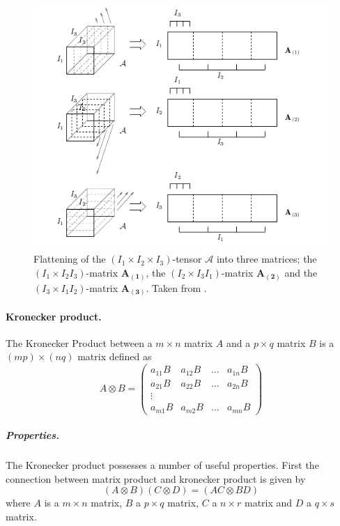 \documentclass[11pt,a4paper]{report}
\begin{document}
\begin{figure}[H]
\centering
\includegraphics[scale=0.75]{images/flattening3.png}
\caption{ Flattening of the $(I_1\times I_2 \times I_3)$-tensor $\mathcal{A}$
into three matrices; the $(I_1\times I_2 I_3)$-matrix $\mathbf{A_{(1)}}$,
the $(I_2\times I_3 I_1)$-matrix $\mathbf{A_{(2)}}$ and the $(I_3\times I_1 I_2)$-matrix $\mathbf{A_{(3)}}$. Taken from \cite{multilinear}.}
\label{fg:flat}
\end{figure}

\paragraph{Kronecker product.} The Kronecker Product between a $m \times n$
matrix $A$ and a $p \times q$ matrix $B$ is a $(mp) \times (nq)$ matrix defined
as
\begin{equation}\label{eq:kronecker}
A \otimes B = 
\begin{pmatrix}
a_{11}B & a_{12}B & \ldots & a_{1n}B\\
a_{21}B & a_{22}B & \ldots & a_{2n}B\\
\vdots& & &\\
a_{m1}B & a_{m2}B & \ldots & a_{mn}B
\end{pmatrix}
\end{equation}

\subparagraph{Properties.}The Kronecker product possesses a number of useful properties. First the
connection between matrix product and kronecker product is given by
\begin{equation}\label{eq:kron_mult}
(A \otimes B)(C \otimes D) = (AC \otimes BD)
\end{equation}
where $A$ is a $m \times n$ matrix, $B$ a $p \times q$ matrix, $C$ a $n \times
r$ matrix and $D$ a $q \times s$ matrix.
\end{document}
